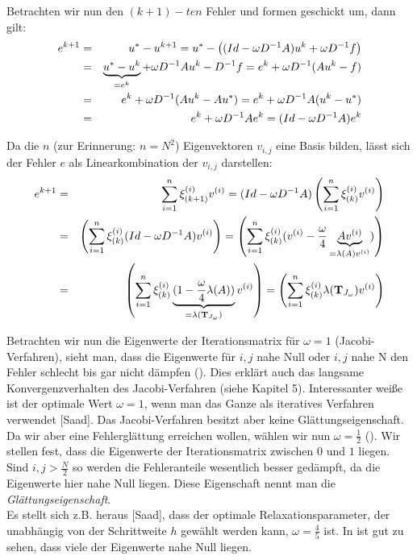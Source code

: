 Betrachten wir nun den $(k+1)-ten$ Fehler und formen geschickt um, dann gilt:
\begin{eqnarray}
e^{k+1} &=& u^{*} - u^{k+1} = u^{*} - \left( (Id - \omega D^{-1} A)u^{k} + \omega D^{-1}f \right) \notag \\
&=& \underbrace{u^{*} - u^{k}}_{= e^{k}} + \omega D^{-1} A u^{k} - D^{-1}f = e^{k} + \omega D^{-1} (Au^{k} - f) \notag \\
&=& e^{k} + \omega D^{-1} (Au^{k} - Au^{*}) = e^{k} + \omega D^{-1} A(u^{k} - u^{*}) \notag \\
&=& e^{k} + \omega D^{-1} A e^{k} = (Id - \omega D^{-1} A) e^{k}
\end{eqnarray}

\label{img.Jacobi1}

Da die $n$ (zur Erinnerung: $n = N^{2}$) Eigenvektoren $v_{i,j}$ eine Basis bilden, lässt sich der Fehler $e$ als Linearkombination der $v_{i,j}$ darstellen:
\begin{eqnarray}
e^{k+1} &=& \sum_{i = 1}^{n} \xi^{(i)}_{(k+1)} v^{(i)} = (Id - \omega D^{-1}A) \left(\sum_{i = 1}^{n} \xi_{(k)}^{(i)} v^{(i)}\right) \notag \\
&=& \left(\sum_{i = 1}^{n} \xi_{(k)}^{(i)} (Id - \omega D^{-1}A) v^{(i)}\right) = \left(\sum_{i = 1}^{n} \xi_{(k)}^{(i)} (v^{(i)} - \frac {\omega} {4} \underbrace{A v^{(i)}}_{= \lambda(A)v^{(i)}})\right) \notag \\
&=& \left(\sum_{i = 1}^{n} \xi_{(k)}^{(i)} \underbrace{(1 - \frac {\omega} {4} \lambda(A))}_{= \lambda({\textbf{T}}_{J_{\omega}})} v^{(i)}\right) = \left(\sum_{i = 1}^{n} \xi_{(k)}^{(i)} \lambda({\textbf{T}}_{J_{\omega}}) v^{(i)}\right)
\end{eqnarray}

\label{img.Jacobi2}

Betrachten wir nun die Eigenwerte der Iterationsmatrix für $\omega = 1$ (Jacobi-Verfahren), sieht man, dass die Eigenwerte für $i,j$ nahe Null oder $i,j$ nahe N den Fehler schlecht bis gar nicht dämpfen (). Dies erklärt auch das langsame Konvergenzverhalten des Jacobi-Verfahren (siehe Kapitel 5). Interessanter weiße ist der optimale Wert $\omega = 1$, wenn man das Ganze als iteratives Verfahren verwendet [Saad]. Das Jacobi-Verfahren besitzt aber keine Glättungseigenschaft.\\
Da wir aber eine Fehlerglättung erreichen wollen, wählen wir nun $\omega = \frac {1} {2}$ (). Wir stellen fest, dass die Eigenwerte der Iterationsmatrix zwischen $0$ und $1$ liegen. Sind $i,j > \frac {N} {2}$ so werden die Fehleranteile wesentlich besser gedämpft, da die Eigenwerte hier nahe Null liegen. Diese Eigenschaft nennt man die \textit{Glättungseigenschaft}.\\
Es stellt sich z.B. heraus [Saad], dass der optimale Relaxationsparameter, der unabhängig von der Schrittweite $h$ gewählt werden kann, $\omega = \frac {4} {5}$ ist. In  ist gut zu sehen, dass viele der Eigenwerte nahe Null liegen.

